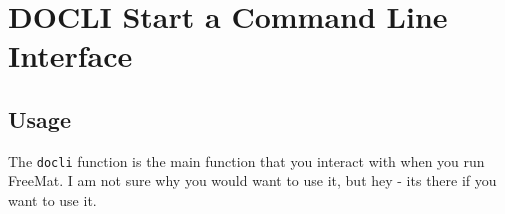 \section{DOCLI Start a Command Line Interface}

\subsection{Usage}

The \verb|docli| function is the main function that you interact with 
when you run FreeMat.  I am not sure why you would want to use
it, but hey - its there if you want to use it.
